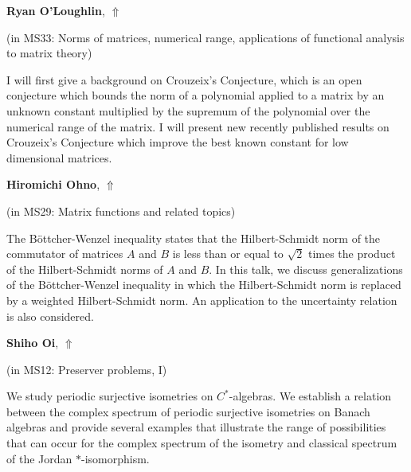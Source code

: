 \documentclass[ILAS2025-program.tex]{subfiles}
\begin{document}
\hypertarget{down0277}{}\begin{ilasabstract}
    
\textbf{Ryan O'Loughlin},  \hfill \hyperlink{up0277}{$\Uparrow$}
    
    
(in {\color{mstitle}MS33: Norms of matrices, numerical range, applications of functional analysis to matrix theory})
        
\mtskip
    I will first give a background on Crouzeix's Conjecture, which is an open conjecture which bounds the norm of a polynomial applied to a matrix by an unknown constant multiplied by the supremum of the polynomial over the numerical range of the matrix. I will present new recently published results on Crouzeix's Conjecture which improve the best known constant for low dimensional matrices.

\end{ilasabstract}
    

\hypertarget{down0014}{}\begin{ilasabstract}
    
\textbf{Hiromichi Ohno},  \hfill \hyperlink{up0014}{$\Uparrow$}
    
    
(in {\color{mstitle}MS29: Matrix functions and related topics})
        
\mtskip
    The B\"ottcher-Wenzel inequality states that the Hilbert-Schmidt norm of the commutator of matrices $A$ and $B$ is less than or equal to $\sqrt{2}$ times the product of the Hilbert-Schmidt norms of $A$ and $B$. In this talk, we discuss generalizations of the B\"ottcher-Wenzel inequality in which the Hilbert-Schmidt norm is replaced by a weighted Hilbert-Schmidt norm. An application to the uncertainty relation is also considered.
\end{ilasabstract}
    

\hypertarget{down0163}{}\begin{ilasabstract}
    
\textbf{Shiho Oi},  \hfill \hyperlink{up0163}{$\Uparrow$}
    
    
(in {\color{mstitle}MS12: Preserver problems, I})
        
\mtskip
    We study periodic surjective isometries on $C^{*}$-algebras.  We establish a relation between the complex spectrum of periodic surjective isometries on Banach algebras  and provide several examples that illustrate the range of possibilities that can occur for the complex spectrum of the isometry and classical spectrum of the Jordan $\ast$-isomorphism.

\end{ilasabstract}
    
\end{document}
